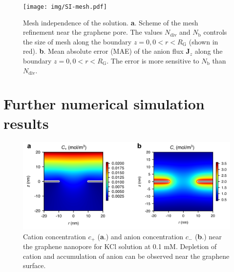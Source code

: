 \documentclass[manuscript=suppinfo,email=true, hyperref=true, keywords=false]{achemso}
\begin{document}
\begin{figure}[htbp]
  \centering
  \texttt{[image: img/SI-mesh.pdf]}
  \caption{Mesh independence of the solution. \textbf{a}. Scheme of
    the mesh refinement near the graphene pore. The values
    $N_{\mathrm{div}}$ and $N_{\mathrm{b}}$ controls the size of mesh
    along the boundary $z=0, 0<r<R_{\mathrm{G}}$ (shown in
    red). \textbf{b}. Mean absolute error (MAE) of the anion flux
    $\boldsymbol{J}_{z}$ along the boundary $z=0,
    0<r<R_{\mathrm{G}}$. The error is more sensitive to
    $N_{\mathrm{b}}$ than $N_{\mathrm{div}}$.}
  \label{fig:mesh}
\end{figure}

\section{Further numerical simulation results}
\label{sec:simu-res}

\begin{figure}[htbp]
  \centering
  \includegraphics[width=0.8\linewidth]{img/SI-concentration.png}
  \caption{Cation concentration $c_{+}$ (\textbf{a}.) and anion
    concentration $c_{-}$ (\textbf{b}.) near the graphene nanopore for
    KCl solution at 0.1 mM. Depletion of cation and accumulation of
    anion can be observed near the graphene surface.}
  \label{fig:conc}
\end{figure}
\end{document}
